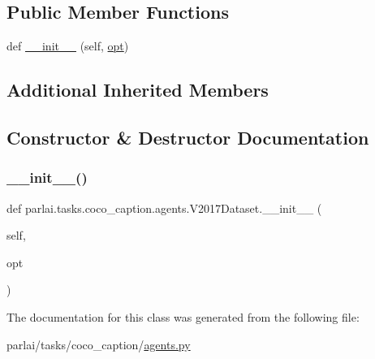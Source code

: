 \subsection*{Public Member Functions}
\begin{DoxyCompactItemize}
\item 
def \hyperlink{classparlai_1_1tasks_1_1coco__caption_1_1agents_1_1V2017Dataset_a7469de10b2d6e7c7563e3bf713cd216e}{\+\_\+\+\_\+init\+\_\+\+\_\+} (self, \hyperlink{classparlai_1_1tasks_1_1coco__caption_1_1agents_1_1DefaultDataset_adaa89b61b63ef4c1291774fda7abaf3c}{opt})
\end{DoxyCompactItemize}
\subsection*{Additional Inherited Members}


\subsection{Constructor \& Destructor Documentation}
\mbox{\label{classparlai_1_1tasks_1_1coco__caption_1_1agents_1_1V2017Dataset_a7469de10b2d6e7c7563e3bf713cd216e}} 
\subsubsection{\texorpdfstring{\+\_\+\+\_\+init\+\_\+\+\_\+()}{\_\_init\_\_()}}
{\footnotesize\ttfamily def parlai.\+tasks.\+coco\+\_\+caption.\+agents.\+V2017\+Dataset.\+\_\+\+\_\+init\+\_\+\+\_\+ (\begin{DoxyParamCaption}\item[{}]{self,  }\item[{}]{opt }\end{DoxyParamCaption})}



The documentation for this class was generated from the following file\+:\begin{DoxyCompactItemize}
\item 
parlai/tasks/coco\+\_\+caption/\hyperlink{parlai_2tasks_2coco__caption_2agents_8py}{agents.\+py}\end{DoxyCompactItemize}
